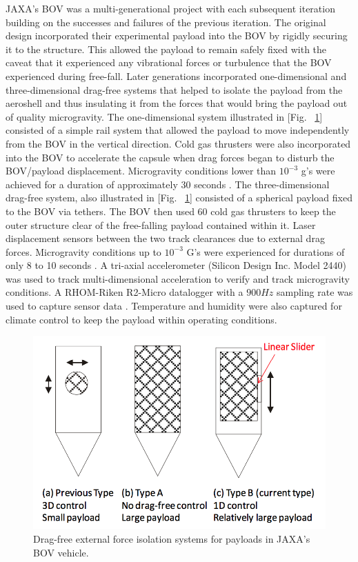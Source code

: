 JAXA's BOV was a multi-generational project with each subsequent iteration building on the successes and failures of the previous iteration. The original design incorporated their experimental payload into the BOV by rigidly securing it to the structure. This allowed the payload to remain safely fixed with the caveat that it experienced any vibrational forces or turbulence that the BOV experienced during free-fall. Later generations incorporated one-dimensional and three-dimensional drag-free systems that helped to isolate the payload from the aeroshell and thus insulating it from the forces that would bring the payload out of quality microgravity. The one-dimensional system illustrated in [Fig. ~\ref{fig:JAXABOV.png}] consisted of a simple rail system that allowed the payload to move independently from the BOV in the vertical direction. Cold gas thrusters were also incorporated into the BOV to accelerate the capsule when drag forces began to disturb the BOV/payload displacement. Microgravity conditions lower than $10^{\minus 3}$ g's were achieved for a duration of approximately 30 seconds \cite{JAXAResults}.  The three-dimensional drag-free system, also illustrated in [Fig. ~\ref{fig:JAXABOV.png}] consisted of a spherical payload fixed to the BOV via tethers. The BOV then used 60 cold gas thrusters to keep the outer structure clear of the free-falling payload contained within it. Laser displacement sensors between the two track clearances due to external drag forces. Microgravity conditions up to $10^{\minus 3}$ G's were experienced for durations of only 8 to 10 seconds \cite{JAXAResults}. A tri-axial accelerometer (Silicon Design Inc. Model 2440) was used to track multi-dimensional acceleration to verify and track microgravity conditions. A RHOM-Riken R2-Micro datalogger with a $900 Hz$ sampling rate was used to capture sensor data \cite{JAXALabs}. Temperature and humidity were also captured for climate control to keep the payload within operating conditions.

\begin{figure}[H]
  \centering
  \includegraphics[width=.4\textwidth]{Figures/JAXABOV.png}
  \caption{\label{fig:JAXABOV.png}Drag-free external force isolation systems for payloads in JAXA's BOV vehicle.}
\end{figure}

